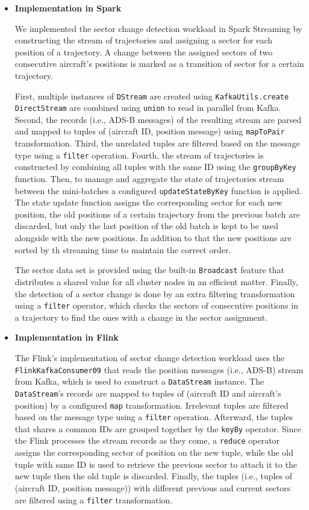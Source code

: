 \documentclass[]{article}
\begin{document}
 \begin{itemize}
 \item {\bf{Implementation in Spark }}
 
 We implemented the sector change detection workload in Spark Streaming by constructing the stream of trajectories and assigning a sector for each position of a trajectory. A change between the assigned sectors of two consecutive aircraft's positions is marked  as a transition of sector for a certain trajectory. \par First, multiple instances of \texttt{DStream} are created using \texttt{KafkaUtils.create} \texttt{DirectStream}  are combined using \texttt{union} to read in  parallel from Kafka. Second, the records (i.e., ADS-B messages) of the resulting stream are parsed and mapped to tuples of (aircraft ID, position message) using \texttt{mapToPair} transformation. Third, the unrelated  tuples are filtered based on the message type using a \texttt{filter} operation. Fourth, the stream of trajectories is constructed by combining all tuples with the same ID using the \texttt{groupByKey} function. Then, to manage and aggregate the state of trajectories stream between the mini-batches a configured \texttt{updateStateByKey} function is applied. The state update function assigns the corresponding sector for each new position, the old positions of a certain trajectory from the previous batch are discarded, but only the last position of the old batch is kept to be used alongside with the new positions. In addition to that the new positions are sorted by th streaming time to maintain the correct order.
 \par The sector data set is provided using the built-in \texttt{Broadcast} feature that distributes a shared value for  all cluster nodes in an efficient matter. Finally, the detection of a sector change is done by an extra filtering transformation using a \texttt{filter} operator, which checks the sectors of consecutive positions in a trajectory to find the ones with a change in the sector assignment.

 
  
 \item {\bf{Implementation in Flink }}
 
 The Flink's implementation of sector change detection workload uses the \texttt{FlinkKafkaConsumer09} that reads the position messages (i.e., ADS-B) stream from Kafka, which is used to construct a \texttt{DataStream} instance. The \texttt{DataStream}'s records are mapped to tuples of (aircraft ID and aircraft's position) by a configured \texttt{map} transformation. Irrelevant tuples are filtered based on the message type using a \texttt{filter} operation. Afterward, the tuples that shares a common IDs are grouped together by the \texttt{keyBy} operator. Since the Flink processes the stream records as they come, a \texttt{reduce} operator assigns the corresponding sector of position on the new tuple, while the old tuple with same ID is used to retrieve the previous sector to attach it to the new tuple then the old tuple is discarded. Finally, the tuples (i.e., tuples of (aircraft ID, position message)) with different previous and current sectors are filtered using a \texttt{filter} transformation.


\end{itemize}
\end{document}
